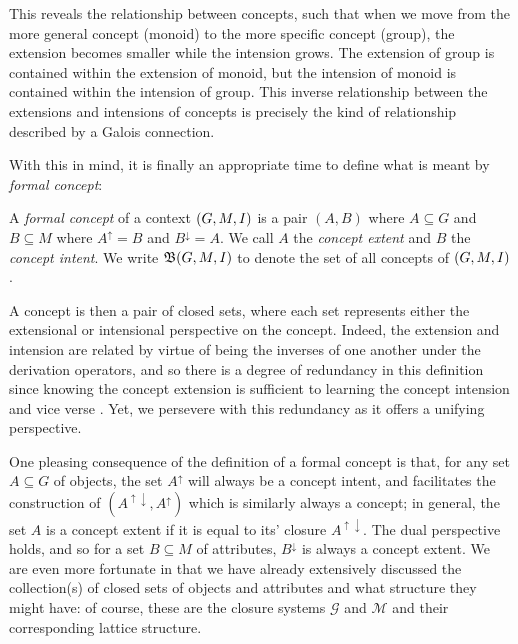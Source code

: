 This reveals the relationship between concepts, such that when we move from the more general concept (monoid) to the
more specific concept (group), the extension becomes smaller while the intension grows. The extension of group is
contained within the extension of monoid, but the intension of monoid is contained within the intension of group. This
inverse relationship between the extensions and intensions of concepts is precisely the kind of relationship described
by a Galois connection.

With this in mind, it is finally an appropriate time to define what is meant by \textit{formal concept}:

\begin{definition}
	  \label{definition:formal-concept} A \emph{formal concept} of a
	context $(G,M,\mathrel{I})$ is a pair $(A,B)$ where $A \subseteq G$ and $B\subseteq M$ where $A^{\uparrow}= B$ and
	$B^{\downarrow}= A$. We call $A$ the \emph{concept extent} and $B$ the \emph{concept intent}. We write ${\mathfrak B} (G,M,\mathrel{I})$ to
	denote the set of all concepts of $(G,M,\mathrel{I})$.
\end{definition}

A concept is then a pair of closed sets, where each set represents either the extensional or intensional perspective on
the concept. Indeed, the extension and intension are related by virtue of being the inverses of one another under the
derivation operators, and so there is a degree of redundancy in this definition since knowing the concept extension is sufficient
to learning the concept intension and vice verse \cite{ganter2016conceptual}. Yet, we persevere with this redundancy as it
offers a unifying perspective.

One pleasing consequence of the definition of a formal concept is that, for any set $A\subseteq G$ of objects, the set $A
^{\uparrow}$ will always be a concept intent, and facilitates the construction of
$(A^{\uparrow \downarrow}, A^{\uparrow})$ which is similarly always a concept; in general, the set $A$ is a concept
extent if it is equal to its' closure $A^{\uparrow \downarrow}$. The dual perspective holds, and so for a set $B \subseteq
M$ of attributes, $B^{\downarrow}$ is always a concept extent. We are even more fortunate in that we have already extensively
discussed the collection(s) of closed sets of objects and attributes and what structure they might have: of course,
these are the closure systems $\mathcal{G}$ and $\mathcal{M}$ and their corresponding lattice structure.

